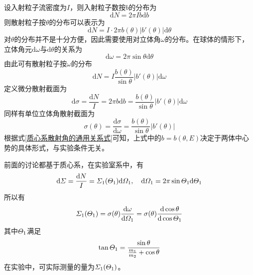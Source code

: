 设入射粒子流密度为$I$，则入射粒子数按$b$的分布为
\begin{equation*}
	\mathrm{d} N = 2\pi I b \mathrm{d}b
\end{equation*}
则散射粒子按$\theta$的分布可以表示为
\begin{equation*}
	\mathrm{d} N = I \cdot 2\pi b(\theta)|b'(\theta)| \mathrm{d} \theta
\end{equation*}
对$\theta$的分布并不是十分方便，因此需要使用对立体角$\omega$的分布。在球体的情形下，立体角元$\mathrm{d} \omega$与$\mathrm{d} \theta$的关系为
\begin{equation*}
	\mathrm{d} \omega = 2\pi \sin \theta\mathrm{d} \theta
\end{equation*}
由此可有散射粒子按$\omega$的分布
\begin{equation*}
	\mathrm{d} N = I \frac{b(\theta)}{\sin \theta}|b'(\theta)| \mathrm{d} \omega
\end{equation*}
定义{\heiti 微分散射截面}为
\begin{equation}
	\mathrm{d} \sigma = \frac{\mathrm{d}N}{I} = 2\pi b \mathrm{d} b = \frac{b(\theta)}{\sin \theta} |b'(\theta)| \mathrm{d} \omega
	\label{微分散射截面}
\end{equation}
同样有{\heiti 单位立体角散射截面}为
\begin{equation}
	\sigma(\theta) = \frac{\mathrm{d} \sigma}{\mathrm{d} \omega} = \frac{b(\theta)}{\sin \theta}|b'(\theta)|
\end{equation}
根据式\eqref{质心系散射角的通用关系式}可知，上式中的$b = b(\theta,E)$决定于两体中心势的具体形式，与实验条件无关。

前面的讨论都基于质心系，在实验室系中，有
\begin{equation*}
	\mathrm{d} \mathnormal{\Sigma} = \frac{\mathrm{d}N}{I} = \mathnormal{\Sigma}_1(\mathnormal{\Theta}_1) \mathrm{d} \mathnormal{\Omega}_1, \quad \mathrm{d} \mathnormal{\Omega}_1 = 2\pi \sin \mathnormal{\Theta}_1 \mathrm{d} \mathnormal{\Theta}_1
\end{equation*}
所以有
\begin{equation*}
	\mathnormal{\Sigma}_1(\mathnormal{\Theta}_1) = \sigma(\theta) \frac{\mathrm{d} \omega}{\mathrm{d} \mathnormal{\Omega}_1} = \sigma(\theta) \frac{\mathrm{d} \cos \theta}{\mathrm{d} \cos \mathnormal{\Theta}_1}
\end{equation*}
其中$\mathnormal{\Theta}_1$满足
\begin{equation*}
	\tan \mathnormal{\Theta}_1 = \frac{\sin \theta}{\frac{m_1}{m_2} + \cos \theta}
\end{equation*}
在实验中，可实际测量的量为$\displaystyle \mathnormal{\Sigma}_1(\mathnormal{\Theta}_1)$。

